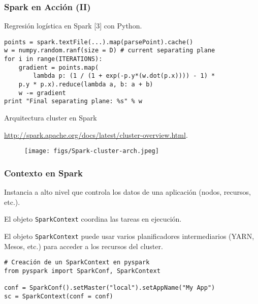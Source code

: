 
\begin{frame}[fragile]
  \frametitle{Spark en Acción (II)}
    \begin{wideitemize}
      \item Regresión logística en Spark [3] con Python.
    \end{wideitemize}
  \fontsize{8pt}{12pt}\selectfont
  \begin{verbatim}
points = spark.textFile(...).map(parsePoint).cache()
w = numpy.random.ranf(size = D) # current separating plane
for i in range(ITERATIONS):
    gradient = points.map(
        lambda p: (1 / (1 + exp(-p.y*(w.dot(p.x)))) - 1) * 
    p.y * p.x).reduce(lambda a, b: a + b)
    w -= gradient
print "Final separating plane: %s" % w
  \end{verbatim}

\end{frame}


\begin{frame}{Arquitectura cluster en Spark}
\begin{wideitemize}
 \item \url{http://spark.apache.org/docs/latest/cluster-overview.html}.
\end{wideitemize}


\begin{figure}
 \centering
 \texttt{[image: figs/Spark-cluster-arch.jpeg]}
\end{figure}

\end{frame}


\begin{frame}[fragile]
  \frametitle{Contexto en Spark}
    \begin{wideitemize}
      \item Instancia a alto nivel que controla los datos de una aplicación
      (nodos, recursos, etc.).
      \item El objeto \texttt{SparkContext} coordina las tareas en ejecución.
      \item El objeto \texttt{SparkContext} puede usar varios planificadores
      intermediarios (YARN, Mesos, etc.) para acceder a los recursos del cluster.
    \end{wideitemize}
  \fontsize{8pt}{12pt}\selectfont
  \begin{verbatim}
# Creación de un SparkContext en pyspark
from pyspark import SparkConf, SparkContext

conf = SparkConf().setMaster("local").setAppName("My App")
sc = SparkContext(conf = conf)
  \end{verbatim}

\end{frame}

